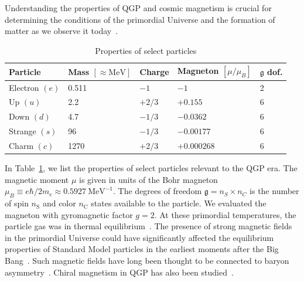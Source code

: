 \documentclass[epjST]{svjour}
\numberwithin{equation}{section}
\begin{document}
Understanding the properties of QGP and cosmic magnetism is crucial for determining the conditions of the primordial Universe and the formation of matter as we observe it today~\cite{Uzan:2010pm,Uzan:2024ded,Grasso:2000wj,Widrow:2002ud,Kandus:2010nw}.
\begin{table}[h]
\centering
\caption{Properties of select particles}
\label{tab:particle_properties}
\begin{tabular}{@{}lllll@{}}
\toprule
\textbf{Particle} & \textbf{Mass} \([\approx\mathrm{MeV}]\) & \textbf{Charge} & \textbf{Magneton} \([\mu/\mu_{B}]\) & \(\mathfrak{g}\) \textbf{dof.} \\ 
\midrule
Electron    \((e)\) & 0.511 & \(-1\)    & \(-1\)         & 2 \\
Up          \((u)\) & 2.2   & \(+2/3\)  & \(+0.155\)     & 6 \\
Down        \((d)\) & 4.7   & \(-1/3\)  & \(-0.0362\)    & 6 \\
Strange     \((s)\) & 96    & \(-1/3\)  & \(-0.00177\)   & 6 \\
Charm       \((c)\) & 1270  & \(+2/3\)  & \(+0.000268\)  & 6 \\ 
\bottomrule
\end{tabular}
\end{table}
In Table~\ref{tab:particle_properties}, we list the properties of select particles relevant to the QGP era. The magnetic moment \(\mu\) is given in units of the Bohr magneton \(\mu_{B}\equiv e\hbar/2m_{e}\approx0.5927\ \mathrm{MeV}^{-1}\). The degrees of freedom \(\mathfrak{g}=n_{S}\times n_{C}\) is the number of spin \(n_\mathrm{S}\) and color \(n_\mathrm{C}\) states available to the particle. We evaluated the magneton with gyromagnetic factor \(g=2\). At these primordial temperatures, the particle gas was in thermal equilibrium~\cite{Rafelski:2023emw}. The presence of strong magnetic fields in the primordial Universe could have significantly affected the equilibrium properties of Standard Model particles in the earliest moments after the Big Bang~\cite{Durrer:2013pga,Subramanian:2015lua}. Such magnetic fields have long been thought to be connected to baryon asymmetry~\cite{Vachaspati:1991nm,Baym:1995fk}. Chiral magnetism in QGP has also been studied~\cite{Fukushima:2008xe,Boyarsky:2011uy,Bali:2011qj}.
\end{document}
